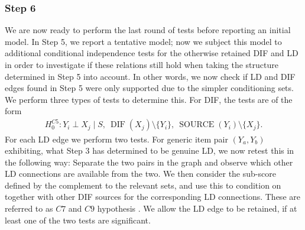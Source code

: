 \documentclass[a4project,12pt]{article}
\theoremstyle{examplestyle}
\theoremstyle{defstyle}
\theoremstyle{thmstyle}
\begin{document}
\subsubsection{Step 6}
We are now ready to perform the last round of tests before reporting an initial model. In Step 5, we report a tentative model; now we subject this model to additional conditional independence tests for the otherwise retained DIF and LD in order to investigate if these relations still hold when taking the structure determined in Step 5 into account. In other words, we now check if LD and DIF edges found in Step 5 were only supported due to the simpler conditioning sets. \\
We perform three types of tests to determine this. For DIF, the tests are of the form
\begin{align}
    H_0^{C5}: Y_i \perp X_j
    \mid
    S,\ \operatorname{DIF}(X_j)\setminus\{Y_i\},\
    \operatorname{SOURCE}(Y_i)\setminus\{X_j\}. \label{C5}
\end{align}
For each LD edge we perform two tests. For generic item pair $(Y_a,Y_b)$ exhibiting, what Step 3 has determined to be genuine LD, we now retest this in the following way: Separate the two pairs in the graph and observe which other LD connections are available from the two. We then consider the sub-score defined by the complement to the relevant sets, and use this to condition on together with other DIF sources for the corresponding LD connections. These are referred to as $C7$ and $C9$ hypothesis \cite{kreiner-christensen-2011}. We allow the LD edge to be retained, if at least one of the two tests are significant. 
\end{document}
